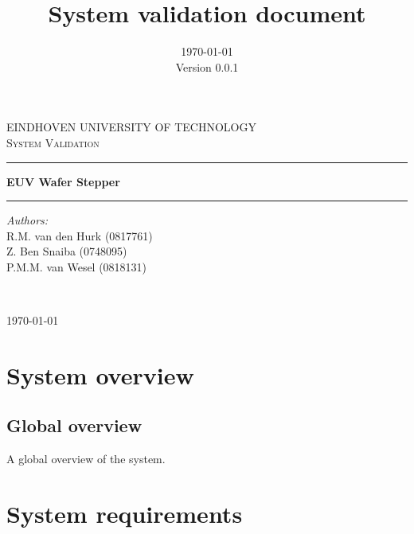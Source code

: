 \documentclass[12pt]{report}
\title{System validation document}
\date{\today \\ Version 0.0.1}
\newcounter{counter}
\begin{document}
	\begin{titlepage}
		\begin{center}
			\textsc{\Large EINDHOVEN UNIVERSITY OF TECHNOLOGY}\\[1.5cm]
			
			\textsc{\Large System Validation}\\[0.8cm]
			\hrule
			\vspace{0.5cm}
			{ \huge \bfseries EUV Wafer Stepper \\[0.4cm] }
			\hrule
			\vspace{1.5cm}
			\noindent
			\begin{minipage}[t]{0.5\textwidth}
				\begin{flushleft} \large
					\emph{Authors:}\\
					R.M. van den Hurk (0817761)\\
					Z. Ben Snaiba (0748095)\\
					P.M.M. van Wesel (0818131)\\
				\end{flushleft}
			\end{minipage}\\
			\vspace{5cm}
			\begin{minipage}[t][8cm]{0.3\textwidth}
				\begin{flushright} \large
					\today
				\end{flushright}
			\end{minipage}
			
			\vfill
			
		\end{center}
	\end{titlepage}
	
	\tableofcontents
	
	\chapter{System overview}
	
	\section{Global overview} 
	A global overview of the system.
	
	\chapter{System requirements}
	
	\newcommand{\req}[1]{
		\item[\textbf{R\stepcounter{counter}\arabic{counter}}] {#1}
		\hrule
	}
	
\end{document}
